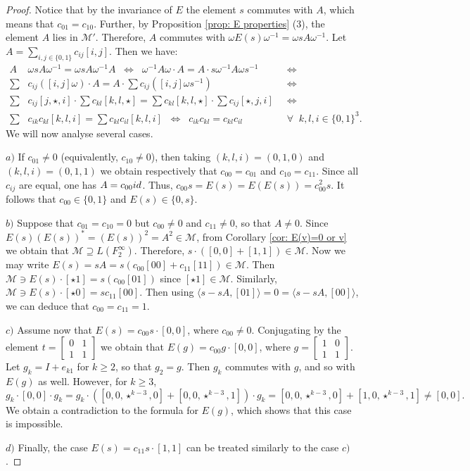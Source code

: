 \documentclass[10pt,a4paper]{amsart}
\newcommand{\id}{{\rm id}}
\begin{document}
\begin{proof}
Notice that by the invariance of $E$ the element $s$ commutes with $A$, which means that $c_{01}=c_{10}$.
Further, by Proposition \ref{prop: E properties} (3), the element $A$ lies in $\mathcal M'$. Therefore, $A$ commutes with $\omega E(s)\omega^{-1}=\omega sA\omega^{-1}$. Let $A=\sum_{i,j\in\{0,1\}}c_{ij}[i,j]$. Then we have:
 \begin{align*}
 	A&\omega s A\omega^{-1}=\omega s A\omega^{-1}A\;\;\Longleftrightarrow\;\;\omega^{-1}A\omega\cdot A=A\cdot s\omega^{-1}A\omega s^{-1}\;\;&\Longleftrightarrow\\
 	\sum  &  c_{ij}([i,j]\omega)\cdot A=A\cdot\sum c_{ij}([i,j]\omega s^{-1})\;\;&\Longleftrightarrow\\ 
 	\sum &   c_{ij}[j,\star,i]\cdot \sum c_{kl}[k,l,\star]   =\sum c_{kl}[k,l,\star]\cdot \sum c_{ij}[\star,j,i]      \;\;&
 	\Longleftrightarrow \\ \sum & c_{ik}c_{kl}[k,l,i] =\sum c_{kl}c_{il}[k,l,i]   \;\;\Longleftrightarrow\;\; c_{ik}c_{kl}=c_{kl}c_{il}\;\;&\forall\;\;k,l,i\in\{0,1\}^3.\;\;\;\;\;\;\;\;\;\;\;\;\;\;
 \end{align*}
We will now analyse several cases.

\smallskip 
\noindent $a)$ If $c_{01}\neq 0$ (equivalently, $c_{10}\neq 0$), then taking $(k,l,i)=(0,1,0)$ and $(k,l,i)=(0,1,1)$ we obtain respectively that $c_{00}=c_{01}$ and $c_{10}=c_{11}$. Since all $c_{ij}$ are equal, one has $A=c_{00}\id$. Thus, $c_{00}s=E(s)=E(E(s))=c_{00}^2s$. It follows that $c_{00}\in \{0,1\}$ and $E(s)\in \{0,s\}$.

\smallskip\noindent
 $b)$ Suppose that $c_{01}=c_{10}=0$ but $c_{00}\neq 0$ and $c_{11}\neq 0$, so that $A \neq 0$. Since $E(s)(E(s))^*=(E(s))^2=A^2\in \mathcal M$, from Corollary \ref{cor: E(v)=0 or v} we obtain that $\mathcal M\supseteq L(F_2^\infty)$. Therefore, $s\cdot ([0,0]+[1,1])\in \mathcal M$. Now we may write $E(s)=sA=s(c_{00}[00]+c_{11}[11])\in \mathcal{M}$. Then $\mathcal{M}\ni E(s)\cdot[\star1]=s(c_{00}[01])$ since $[\star1]\in\mathcal{M}$. Similarly, $\mathcal{M}\ni E(s)\cdot [\star0]=sc_{11}[00]$. Then using $\langle s-sA, [01]\rangle=0=\langle s-sA,[00]\rangle$, we can deduce that $c_{00}=c_{11}=1$.

 
 \smallskip \noindent $c)$ Assume now that $E(s)=c_{00}s\cdot [0,0]$, where $c_{00}\neq 0$. Conjugating by the element $t=\begin{bmatrix}
 	0&1\\1&1
 \end{bmatrix}$ we obtain that $E(g)=c_{00}g\cdot [0,0]$, where $g=\begin{bmatrix}
 	1&0\\1&1
 \end{bmatrix}$. Let $g_k=I+e_{k1}$ for $k\geqslant 2$, so that $g_2=g$. Then $g_k$ commutes with $g$, and so with $E(g)$ as well. However, for $k\geqslant 3$, $$g_k\cdot [0,0]\cdot g_k= g_k\cdot ([0,0,\star^{k-3},0]+[0,0,\star^{k-3},1])\cdot g_k=[0,0,\star^{k-3},0]+[1,0,\star^{k-3},1]\neq [0,0].$$
  We obtain a contradiction to the formula for $E(g)$, which shows that this case is impossible.

\smallskip \noindent $d)$ Finally, the case $E(s)=c_{11}s\cdot [1,1]$ can be treated similarly to the case $c)$.

\end{proof}	
\end{document}
